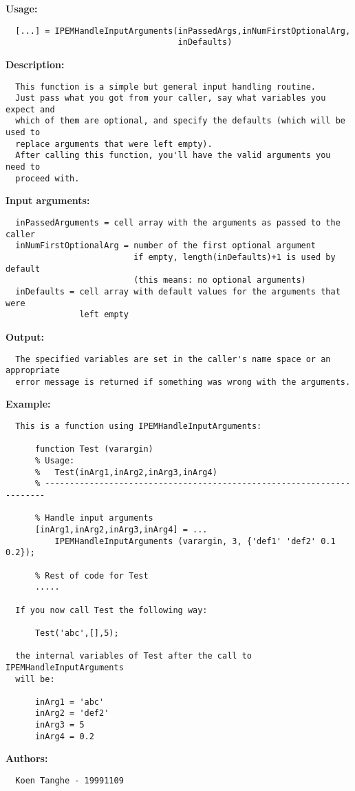 \textbf{Usage:}
\begin{verbatim}  [...] = IPEMHandleInputArguments(inPassedArgs,inNumFirstOptionalArg,
                                   inDefaults)

\end{verbatim}
\textbf{Description:}
\begin{verbatim}  This function is a simple but general input handling routine.
  Just pass what you got from your caller, say what variables you expect and
  which of them are optional, and specify the defaults (which will be used to
  replace arguments that were left empty).
  After calling this function, you'll have the valid arguments you need to
  proceed with.

\end{verbatim}
\textbf{Input arguments:}
\begin{verbatim}  inPassedArguments = cell array with the arguments as passed to the caller
  inNumFirstOptionalArg = number of the first optional argument
                          if empty, length(inDefaults)+1 is used by default
                          (this means: no optional arguments)
  inDefaults = cell array with default values for the arguments that were
               left empty

\end{verbatim}
\textbf{Output:}
\begin{verbatim}  The specified variables are set in the caller's name space or an appropriate
  error message is returned if something was wrong with the arguments.

\end{verbatim}
\textbf{Example:}
\begin{verbatim}
  This is a function using IPEMHandleInputArguments:

      function Test (varargin)
      % Usage: 
      %   Test(inArg1,inArg2,inArg3,inArg4)
      % ----------------------------------------------------------------------

      % Handle input arguments
      [inArg1,inArg2,inArg3,inArg4] = ...
          IPEMHandleInputArguments (varargin, 3, {'def1' 'def2' 0.1 0.2});

      % Rest of code for Test
      .....

  If you now call Test the following way:

      Test('abc',[],5);

  the internal variables of Test after the call to IPEMHandleInputArguments
  will be:

      inArg1 = 'abc'
      inArg2 = 'def2'
      inArg3 = 5
      inArg4 = 0.2

\end{verbatim}
\textbf{Authors:}
\begin{verbatim}  Koen Tanghe - 19991109
\end{verbatim}


